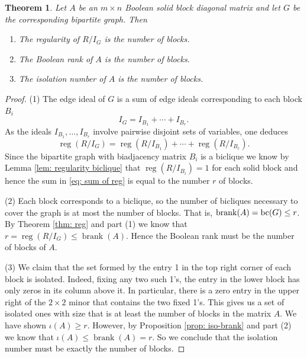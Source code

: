 \documentclass[11pt,letterpaper, reqno]{amsart}
\newtheorem{theorem}{Theorem}[section]
\theoremstyle{definition}
\theoremstyle{remark}
\DeclareMathOperator{\reg}{reg}
\DeclareMathOperator{\brank}{brank}
\numberwithin{equation}{section}
\begin{document}
\begin{theorem}
    \label{thm: block diagonal}
Let $A$ be an $m\times n$ Boolean solid block diagonal matrix and let  $G$ be the corresponding bipartite graph. Then \begin{enumerate}
    \item The regularity of $R/I_G$ is the number of blocks.
    \item The Boolean rank of $A$ is the number of blocks.
    \item The isolation number of $A$ is the number of blocks.
\end{enumerate}
\end{theorem}
\begin{proof}
(1) The edge ideal of $G$ is a sum of edge ideals corresponding to each block $B_i$
\[
I_G=I_{B_1}+\cdots+I_{B_r}.
\]
As the ideals $I_{B_1},\ldots, I_{B_r}$ involve pairwise disjoint sets of variables, one deduces 
\begin{equation}\label{eq: sum of reg}
\reg(R/I_G)=\reg(R/I_{B_1})+\cdots+\reg(R/I_{B_r}).
\end{equation}
Since the bipartite graph with biadjacency matrix $B_i$ is a biclique we know by Lemma \ref{lem: regularity biclique} that $\reg(R/I_{B_i})=1$ for each solid block and hence the sum in \eqref{eq: sum of reg} is equal to the number $r$ of blocks.

(2) Each block corresponds to a biclique, so the number of bicliques necessary  to cover the graph is at most the number of blocks. That is, $\brank(A)={\rm bc}(G)\leq r$. 
By Theorem \ref{thm: reg} and part (1) we know that $r=\reg(R/I_G)\leq \brank(A)$. 
  Hence the Boolean rank must be the number of blocks of $A$.

    
(3) %
 We claim that the set formed by the entry 1 in the top right corner of each block is isolated. Indeed, fixing any two such 1's, the entry in the lower block has only zeros in its column above it. In particular, there is a zero entry in the upper right of the $2\times 2$ minor that contains the two fixed 1's. This gives us a set of isolated ones with size that is at least the number of blocks in the matrix $A$. We have shown $\iota(A)\geq r$.
However, by Proposition \ref{prop: iso-brank} and part (2)  we know that $\iota(A)\leq \brank(A)=r$. So we conclude that the isolation number must be exactly the number of blocks.
\end{proof}
\end{document}
